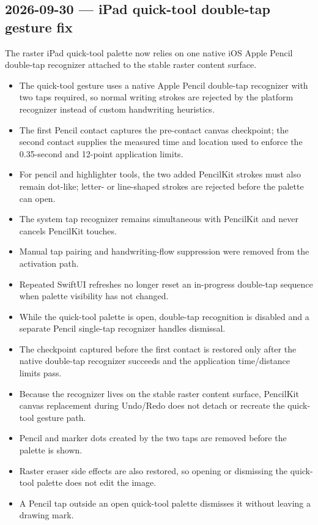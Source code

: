 \documentclass[a4paper]{article}
\title{}
\date{}
\author{Mohammad Rahmani}
\begin{document}
   \maketitle

   \begin{preview}
      \section*{2026-09-30 --- iPad quick-tool double-tap gesture fix}

      The raster iPad quick-tool palette now relies on one native iOS Apple Pencil double-tap recognizer attached to the stable raster content surface.

      \begin{itemize}
         \item The quick-tool gesture uses a native Apple Pencil double-tap recognizer with two taps required, so normal writing strokes are rejected by the platform recognizer instead of custom handwriting heuristics.
         \item The first Pencil contact captures the pre-contact canvas checkpoint; the second contact supplies the measured time and location used to enforce the 0.35-second and 12-point application limits.
         \item For pencil and highlighter tools, the two added PencilKit strokes must also remain dot-like; letter- or line-shaped strokes are rejected before the palette can open.
         \item The system tap recognizer remains simultaneous with PencilKit and never cancels PencilKit touches.
         \item Manual tap pairing and handwriting-flow suppression were removed from the activation path.
         \item Repeated SwiftUI refreshes no longer reset an in-progress double-tap sequence when palette visibility has not changed.
         \item While the quick-tool palette is open, double-tap recognition is disabled and a separate Pencil single-tap recognizer handles dismissal.
         \item The checkpoint captured before the first contact is restored only after the native double-tap recognizer succeeds and the application time/distance limits pass.
         \item Because the recognizer lives on the stable raster content surface, PencilKit canvas replacement during Undo/Redo does not detach or recreate the quick-tool gesture path.
         \item Pencil and marker dots created by the two taps are removed before the palette is shown.
         \item Raster eraser side effects are also restored, so opening or dismissing the quick-tool palette does not edit the image.
         \item A Pencil tap outside an open quick-tool palette dismisses it without leaving a drawing mark.
      \end{itemize}
   \end{preview}

   
   
\end{document}
